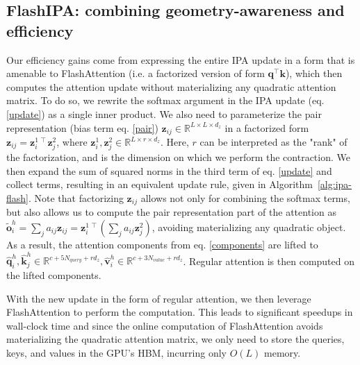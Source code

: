\documentclass{article}
\newcommand{\R}{\ensuremath{\mathbb{R}}}
\begin{document}
\subsection{FlashIPA: combining geometry-awareness and efficiency}
Our efficiency gains come from expressing the entire IPA update in a form that is amenable to FlashAttention (i.e. a factorized version of form $\mathbf{q^\intercal} \mathbf{k}$), which then computes the attention update without materializing any quadratic attention matrix. To do so, we rewrite the softmax argument in the IPA update (eq. \eqref{update}) as a single inner product.
We also need to parameterize the pair representation (bias term eq. \eqref{pair}) $\mathbf{z}_{ij}\in \R^{L\times L \times d_z}$ in a factorized form $\mathbf{z}_{ij}=\mathbf{z}^{1\, \intercal}_i \mathbf{z}^2_j$, where $\mathbf{z}^1_i, \mathbf{z}^2_j \in \R^{L\times r \times d_z}$. Here, $r$ can be interpreted as the "rank" of the factorization, and is the dimension on which we perform the contraction. We then expand the sum of squared norms in the third term of eq. \eqref{update} and collect terms, resulting in an equivalent update rule, given in Algorithm~\ref{alg:ipa-flash}. Note that factorizing $\mathbf{z}_{ij}$ allows not only for combining the softmax terms, but also allows us to compute the pair representation part of the attention as $\tilde{\mathbf{o}}_i^h=\sum_j{a_{ij}\mathbf{z}_{ij}}=\mathbf{z}_i^{1\,\intercal}\left(\sum_j{a_{ij}\mathbf{z}_j^2}\right)$, avoiding materializing any quadratic object.
As a result, the attention components from eq. \eqref{components} are lifted to $\hat{\mathbf{q}}_i^h, \hat{\mathbf{k}}_j^h \in \R^{c+5N_{query}+rd_z}, \hat{\mathbf{v}}_i^h \in \R^{c+3N_{value}+rd_z}$. Regular attention is then computed on the lifted components.

With the new update in the form of regular attention, we then leverage FlashAttention to perform the computation. This leads to significant speedups in wall-clock time and since the online computation of FlashAttention avoids materializing the quadratic attention matrix, we only need to store the queries, keys, and values in the GPU's HBM, incurring only $O(L)$ memory.
\end{document}

